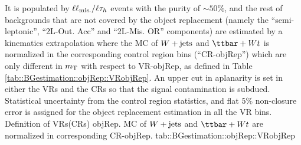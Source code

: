 It is populated by $\ell\ell_{\mathrm{mis.}} / \ell\tau_h$ events with the purity of $\sim 50\%$, and the rest of backgrounds that are not covered by the object replacement (namely the ``semi-leptonic'', ``2L-Out. Acc'' and ``2L-Mis. OR'' components) are estimated by a kinematics extrapolation where the MC of $W+\mathrm{jets}$ and $\ttbar+Wt$ is normalized in the corresponding control region bins (``CR-objRep'') which are only different in $m_{\mathrm{T}}$ with respect to VR-objRep, as defined in Table \ref{tab::BGestimation::objRep::VRobjRep}. An upper cut in aplanarity is set in either the VRs and the CRs so that the signal contamination is subdued. Statistical uncertainty from the control region statistics, and flat $5\%$ non-closure error is assigned for the object replacement estimation in all the VR bins. \\

{Definition of VRs(CRs) objRep. MC of $W+\mathrm{jets}$ and $\ttbar+Wt$ are normalized in corresponding CR-objRep.}
{tab::BGestimation::objRep::VRobjRep}

